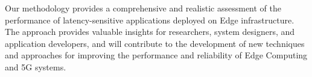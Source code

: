 Our methodology provides a comprehensive and realistic assessment of the performance of latency-sensitive applications deployed on Edge infrastructure.
The approach provides valuable insights for researchers, system designers, and application developers, and will contribute to the development of new techniques and approaches for improving the performance and reliability of Edge Computing and 5G systems.
